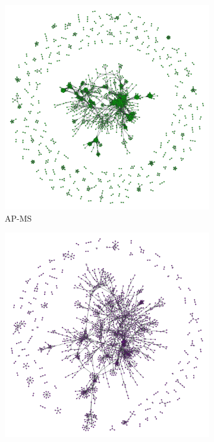 \begin{figure}[!ht]
    \centering
    \begin{subfigure}[b]{0.30\columnwidth}
        \includegraphics[width=\textwidth]{./schemes/yeast_AP-MS-txt.pdf}
        \caption{\label{fig:ap_ms} AP-MS}
    \end{subfigure}
    \begin{subfigure}[b]{0.30\columnwidth}
        \includegraphics[width=\textwidth]{./schemes/yeast_LIT-txt.pdf}

\end{subfigure}
\end{figure}
